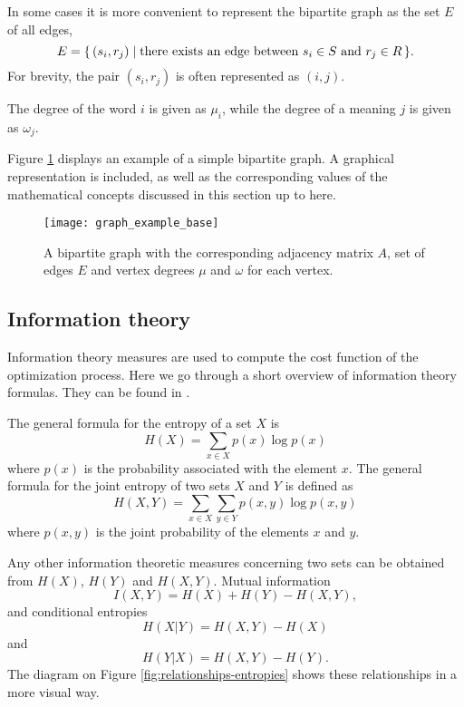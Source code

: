 In some cases it is more convenient to represent the bipartite graph as the set $E$ of all edges,
\begin{equation*}
  E = \{\,(s_i,r_j)\mid\text{there exists an edge between $s_i \in S$ and $r_j \in R$}\,\}.
\end{equation*}
For brevity, the pair $(s_i, r_j)$ is often represented as $(i,j)$.

The degree of the word $i$ is given as $\mu_i$, while the degree of a meaning $j$ is given as $\omega_j$.

Figure \ref{fig:graph-example-base} displays an example of a simple bipartite graph.
A graphical representation is included, as well as the corresponding values of the mathematical concepts discussed in this section up to here.

\begin{figure}
  \centering
  \texttt{[image: graph\_example\_base]}
  \caption{%
    A bipartite graph with the corresponding adjacency matrix $A$, set of edges $E$ and vertex degrees $\mu$ and $\omega$ for each vertex.
  }
  \label{fig:graph-example-base}
\end{figure}

\subsection{Information theory}
\label{sec:introduction_model_info-theory}

Information theory measures are used to compute the cost function of the optimization process.
Here we go through a short overview of information theory formulas. They can be found in \cite{Cover1999}.

The general formula for the entropy of a set $X$ is
\begin{equation}
  \label{eq:definition-entropy-generic}
  H(X) = \sum_{x \in X} p(x) \log p(x)
\end{equation}
where $p(x)$ is the probability associated with the element $x$.
The general formula for the joint entropy of two sets $X$ and $Y$ is defined as
\begin{equation}
  \label{eq:definition-joint-entropy-generic}
  H(X,Y) = \sum_{x \in X} \sum_{y \in Y} p(x,y) \log p(x,y)
\end{equation}
where $p(x,y)$ is the joint probability of the elements $x$ and $y$.

Any other information theoretic measures concerning two sets can be obtained from $H(X)$, $H(Y)$ and $H(X,Y)$.
Mutual information
\begin{equation*}
  I(X,Y) = H(X) + H(Y) - H(X,Y),
\end{equation*}
and conditional entropies
\begin{equation*}
  H(X|Y) = H(X,Y) - H(X)
\end{equation*}
and
\begin{equation*}
  H(Y|X) = H(X,Y) - H(Y).
\end{equation*}
The diagram on Figure \ref{fig:relationships-entropies} shows these relationships in a more visual way.

